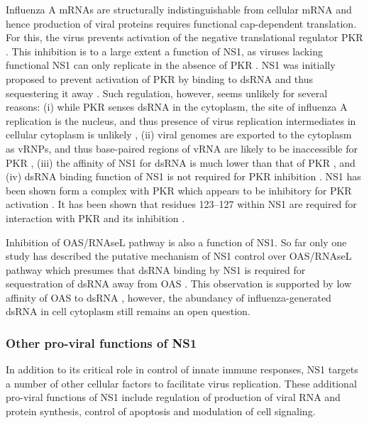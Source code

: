 		Influenza A mRNAs are structurally indistinguishable from cellular mRNA and hence production of viral proteins requires functional cap-dependent translation. For this, the virus prevents activation of the negative translational regulator \gls{PKR}  \parencite{Katze1986, Katze1988}. This inhibition is to a large extent a function of \gls{NS1}, as viruses lacking functional \gls{NS1} can only replicate in the absence of \gls{PKR} \parencite{Bergmann2000a}. \gls{NS1} was initially proposed to prevent activation of \gls{PKR} by binding to dsRNA and thus sequestering it away \parencite{Lu1995}. Such regulation, however, seems unlikely for several reasons: (i) while \gls{PKR} senses dsRNA in the cytoplasm, the site of influenza A replication is the nucleus, and thus presence of virus replication intermediates in cellular cytoplasm is unlikely \parencite{Jackson1982}, (ii) viral genomes are exported to the cytoplasm as \gls{vRNP}s, and thus base-paired regions of \gls{vRNA} are likely to be inaccessible for \gls{PKR} \parencite{Coloma2009}, (iii) the affinity of \gls{NS1} for dsRNA is much lower than that of \gls{PKR} \parencite{Chien2004, Husain2012}, and (iv) dsRNA binding function of \gls{NS1} is not required for \gls{PKR} inhibition \parencite{Li2006}. \gls{NS1} has been shown form a complex with \gls{PKR} which appears to be inhibitory for \gls{PKR} activation \parencite{Tan1998, Li2006}. It has been shown that residues 123--127 within \gls{NS1} are required for interaction with \gls{PKR} and its inhibition \parencite{Min2007}.	
				
		Inhibition of \gls{OAS}/\gls{RNAseL} pathway is also a function of \gls{NS1}. So far only one study has described the putative mechanism of \gls{NS1} control over \gls{OAS}/\gls{RNAseL} pathway which presumes that dsRNA binding by NS1 is required for sequestration of dsRNA away from \gls{OAS} \parencite{Min2006}. This observation is supported by low affinity of \gls{OAS} to dsRNA \parencite{Hartmann2003}, however, the abundancy of influenza-generated dsRNA in cell cytoplasm still remains an open question.
		
		\subsubsection{Other pro-viral functions of NS1}
		
		In addition to its critical role in control of innate immune responses, NS1 targets a number of other cellular factors to facilitate virus replication. These additional pro-viral functions of NS1 include regulation of production of viral RNA and protein synthesis, control of apoptosis and modulation of cell signaling.
		
